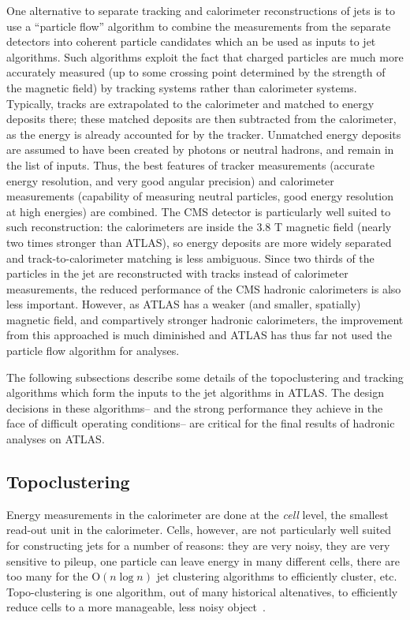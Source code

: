 One alternative to separate tracking and calorimeter reconstructions of jets is to use a ``particle flow'' algorithm to combine the measurements from the separate detectors into coherent particle candidates which an be used as inputs to jet algorithms. Such algorithms exploit the fact that charged particles are much more accurately measured (up to some crossing point determined by the strength of the magnetic field) by tracking systems rather than calorimeter systems. Typically, tracks are extrapolated to the calorimeter and matched to energy deposits there; these matched deposits are then subtracted from the calorimeter, as the energy is already accounted for by the tracker. Unmatched energy deposits are assumed to have been created by photons or neutral hadrons, and remain in the list of inputs. Thus, the best features of tracker measurements (accurate energy resolution, and very good angular precision) and calorimeter measurements (capability of measuring neutral particles, good energy resolution at high energies) are combined. The CMS detector is particularly well suited to such reconstruction: the calorimeters are inside the 3.8 T magnetic field (nearly two times stronger than ATLAS), so energy deposits are more widely separated and track-to-calorimeter matching is less ambiguous. Since two thirds of the particles in the jet are reconstructed with tracks instead of calorimeter measurements, the reduced performance of the CMS hadronic calorimeters is also less important. However, as ATLAS has a weaker (and smaller, spatially) magnetic field, and compartively stronger hadronic calorimeters, the improvement from this approached is much diminished and ATLAS has thus far not used the particle flow algorithm for analyses. 

The following subsections describe some details of the topoclustering and tracking algorithms which form the inputs to the jet algorithms in ATLAS. The design decisions in these algorithms-- and the strong performance they achieve in the face of difficult operating conditions-- are critical for the final results of hadronic analyses on ATLAS.

\subsection{Topoclustering}
\label{jet-reconstruction:jet-inputs:topoclustering}

Energy measurements in the calorimeter are done at the \textit{cell} level, the smallest read-out unit in the calorimeter. Cells, however, are not particularly well suited for constructing jets for a number of reasons: they are very noisy, they are very sensitive to pileup, one particle can leave energy in many different cells,  there are too many for the $\mathrm{O}( n \log n)$ jet clustering algorithms to efficiently cluster, etc. Topo-clustering is one algorithm, out of many historical altenatives, to efficiently reduce cells to a more manageable, less noisy object~\cite{JES2010,JES2011}.


